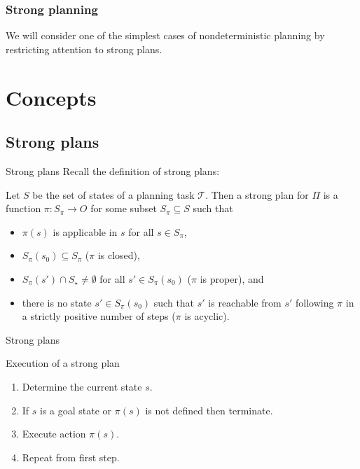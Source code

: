 \documentclass{gkibeamer}
\begin{document}
\subtitle{14.~Strong nondeterministic planning}
\date{January 24th, 2012}
\maketitles

\begin{frame}
  \frametitle{Strong planning}

  We will consider one of the simplest cases of nondeterministic
  planning by restricting attention to \alert{strong plans}.
\end{frame}

\section{Concepts}
\subsection{Strong plans}

\begin{frame}{Strong plans}
  Recall the definition of strong plans:
  
  \medskip
  
  \begin{definition}
    Let $S$ be the set of states of a planning task $\mathcal T$. Then a
    \alert{strong plan} for $\Pi$ is a function $\pi: S_\pi \to O$ for
    some subset $S_\pi \subseteq S$ such that
    \begin{itemize}
    \item $\pi(s)$ is applicable in $s$ for all $s \in S_\pi$,
    \item $S_\pi(s_0) \subseteq S_\pi$ ($\pi$ is closed),
    \item $S_\pi(s') \cap S_\star \neq \emptyset$ for all $s' \in S_\pi(s_0)$ ($\pi$ is proper), and
    \item there is no state $s' \in S_\pi(s_0)$ such that $s'$ is
      reachable from $s'$ following $\pi$ in a strictly positive number
      of steps ($\pi$ is acyclic).
    \end{itemize}
  \end{definition}
\end{frame}

\begin{frame}{Strong plans}
  \begin{block}{Execution of a strong plan}
    \begin{enumerate}
    \item Determine the current state $s$.
    \item If $s$ is a goal state or $\pi(s)$ is not defined then
      terminate.
    \item Execute action $\pi(s)$.
    \item Repeat from first step.
    \end{enumerate}
  \end{block}
\end{frame}
\end{document}
